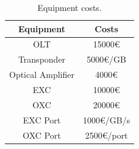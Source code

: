 \begin{table}[H]
	\centering
	\begin{tabular}{|c|c|}
		\hline
		Equipment         & Costs      \\ \hline
		OLT               & 15000\euro     \\ \hline
		Transponder       & 5000\euro/GB   \\ \hline
		Optical Amplifier & 4000\euro      \\ \hline
		EXC               & 10000\euro     \\ \hline
		OXC               & 20000\euro     \\ \hline
		EXC Port          & 1000\euro/GB/s \\ \hline
		OXC Port          & 2500\euro/port \\ \hline
	\end{tabular}
	\caption{Equipment costs.}
	\label{equipment_costs}
\end{table}


